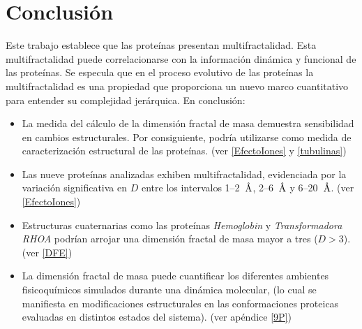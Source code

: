 \chapter{Conclusi\'{o}n}


\color{blue}

Este trabajo establece que las prote\'{i}nas presentan multifractalidad. Esta multifractalidad puede correlacionarse con la informaci\'{o}n din\'{a}mica y funcional de las prote\'{i}nas. Se especula que en el proceso evolutivo de las prote\'{i}nas la multifractalidad es una propiedad que proporciona un nuevo marco cuantitativo para entender su complejidad jer\'{a}rquica. En conclusi\'{o}n:


\begin{itemize}
	\item La medida del c\'{a}lculo de la dimensi\'{o}n fractal de masa demuestra sensibilidad en
	 cambios estructurales. Por consiguiente, podr\'{i}a utilizarse como medida de caracterizaci\'{o}n estructural de las prote\'{i}nas. (ver \ref{EfectoIones} y \ref{tubulinas})
	
	\item Las nueve prote\'{i}nas analizadas exhiben multifractalidad, evidenciada por la variaci\'{o}n 
	significativa en $D$ entre los intervalos 1--2~$\textup{\r{A}}$, 2--6~$\textup{\r{A}}$ y 6--20~$\textup{\r{A}}$. (ver \ref{EfectoIones})
	
	\item Estructuras cuaternarias como las prote\'{i}nas \textit{Hemoglobin} y \textit{Transformadora RHOA} podr\'{i}an arrojar una dimensi\'{o}n fractal de masa mayor a tres ($D>3$).(ver \ref{DFE})
	
	
	\item La dimensi\'{o}n fractal de masa puede cuantificar los diferentes ambientes fisicoqu\'{i}micos simulados durante una din\'{a}mica molecular, (lo cual se manifiesta en modificaciones estructurales en las conformaciones proteicas evaluadas en distintos estados del sistema). (ver apéndice \ref{9P})
	
 \color{black}
 
\end{itemize}



